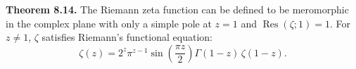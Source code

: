 \textbf{Theorem 8.14.} The Riemann zeta function can be defined to be meromorphic in the complex plane with only a simple pole at $z = 1$ and $\operatorname{Res}(\zeta; 1) = 1$. For $z \neq 1$, $\zeta$ satisfies Riemann's functional equation:
$$\zeta(z) = 2^z \pi^{z-1} \sin\left(\frac{\pi z}{2}\right) \Gamma(1-z) \, \zeta(1-z).$$
